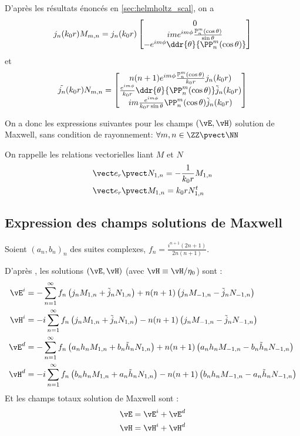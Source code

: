 D'après les résultats énoncés en \ref{sec:helmholtz_scal}, on a
\[
  j_n(k_0r)M_{m,n} = j_n(k_0r)
  \begin{bmatrix}
    0\\
    ime^{im\phi}\frac{\mathbb{P}^m_n(\cos\theta)}{\sin\theta}\\
    -e^{im\phi}\ddr{\theta}{\PP^m_n(\cos\theta)}\\
  \end{bmatrix}
\]
et
\[
  \tilde{j_n}(k_0r)N_{m,n}=
    \begin{bmatrix}
    n(n+1)e^{im\phi}\frac{\mathbb{P}^m_n(\cos\theta)}{k_0r}j_n(k_0r)\\
    \frac{e^{im\phi}}{k_0r}\ddr{\theta}{\PP^m_n(\cos\theta)}\tilde j_n(k_0r)\\
    im\frac{e^{im\phi}}{k_0r\sin\theta}\PP^m_n(\cos\theta)\tilde j_n(k_0r)
  \end{bmatrix}
\]

On a donc les expressions suivantes pour les champs \((\vE,\vH)\) solution de Maxwell, sans condition de rayonnement:
\(\forall m,n \in \ZZ\pvect\NN\)




On rappelle les relations vectorielles liant \(M\) et \(N\)
\begin{align*}
  &\vect e_r \pvect N_{1,n} = -\frac{1}{k_0r}M_{1,n} \\
  &\vect e_r \pvect M_{1,n} = k_0r N_{1,n}^t
\end{align*}

\subsection{Expression des champs solutions de Maxwell}
Soient \((a_n,b_n)_n\) des suites complexes, \(f_n = \frac{i^{n+1}(2n+1)}{2n(n+1)}\).

D’après \cite{morse_methods_1953}, les solutions \((\vE,\vH)\) (avec \(\vH \equiv \vH /\eta_0 \)) sont :
\begin{align*}
  \vE^i &= -\sum_{n=1}^\infty f_n \left( j_nM_{1,n} + \tilde j_n N_{1,n} \right) + n(n+1)\left(j_n M_{-1,n} - \tilde j_nN_{-1,n} \right)\\
  \vH^i &= -i\sum_{n=1}^\infty f_n \left( j_nM_{1,n} + \tilde j_nN_{1,n} \right) - n(n+1)\left(j_n M_{-1,n} - \tilde j_n N_{-1,n} \right)\\
  \vE^d &= -\sum_{n=1}^\infty f_n \left( a_n h_nM_{1,n} + b_n\tilde h_nN_{1,n} \right) + n(n+1)\left(a_nh_nM_{-1,n} - b_n\tilde h_nN_{-1,n} \right)\\
  \vH^d &= -i\sum_{n=1}^\infty f_n \left( b_nh_nM_{1,n} + a_n\tilde h_nN_{1,n} \right) - n(n+1)\left(b_nh_nM_{-1,n} - a_n\tilde h_nN_{-1,n} \right)\\
\end{align*}
Et les champs totaux solution de Maxwell sont :
\begin{align}
  \vE = \vE^i + \vE^d\label{eq:solEmie}\\
  \vH = \vH^i + \vH^d\label{eq:solHmie}
\end{align}

